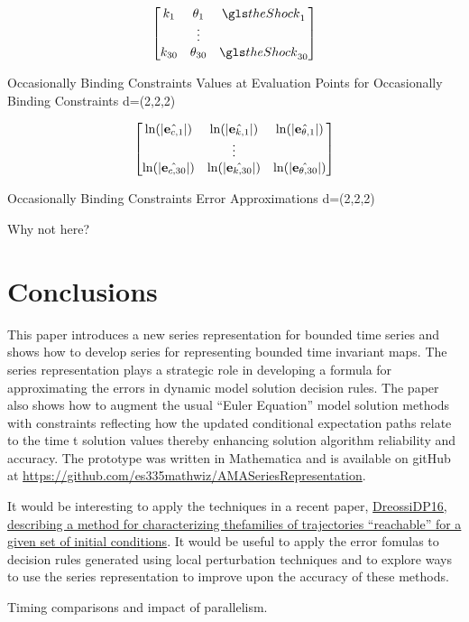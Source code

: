 \documentclass[12pt]{article}
\begin{document}
\begin{table}
  \centering
  
\begin{gather*}
  \begin{bmatrix}
    k_1&\theta_1&\theShock_1\\
&\vdots\\
    k_{30}&\theta_{30}&\theShock_{30}\\
  \end{bmatrix}\\
% 
\end{gather*}

  \caption{Occasionally Binding Constraints Values at Evaluation Points for Occasionally Binding Constraints \label{valatobcB}  d=(2,2,2)}
\end{table}


 \begin{table}
   \centering

   \begin{gather*}
\forEstErr\\
%   
   \end{gather*}
   \caption{Occasionally Binding Constraints Error Approximations\label{esterrobcB}  d=(2,2,2)}
 \end{table}

Why not here?



\clearpage
\section{Conclusions}
This paper introduces a new series representation for bounded time series and
shows how to develop  series for representing bounded time invariant maps.
The series representation plays a strategic role in developing a formula 
for approximating the errors in dynamic model solution decision rules. 
 The paper
also shows how to  augment the usual ``Euler Equation'' model solution
methods with constraints reflecting how the updated
conditional expectation paths relate to the time t solution values thereby
enhancing solution algorithm reliability and accuracy.
The prototype was written in Mathematica and is available on gitHub
at \href{https://github.com/es335mathwiz/AMASeriesRepresentation}{https://github.com/es335mathwiz/AMASeriesRepresentation}.

{\color{blue}
It would be interesting to apply the techniques in a recent paper, \href{https://github.com/dreossi/sapo}{DreossiDP16, describing a method for characterizing thefamilies of trajectories ``reachable'' for a given set of initial conditions}.
It would be useful to apply the error fomulas to decision rules generated
using local perturbation techniques and to explore ways to use the series
representation to improve upon the accuracy of these methods.

Timing comparisons and impact of parallelism.
}
\newpage
\end{document}
